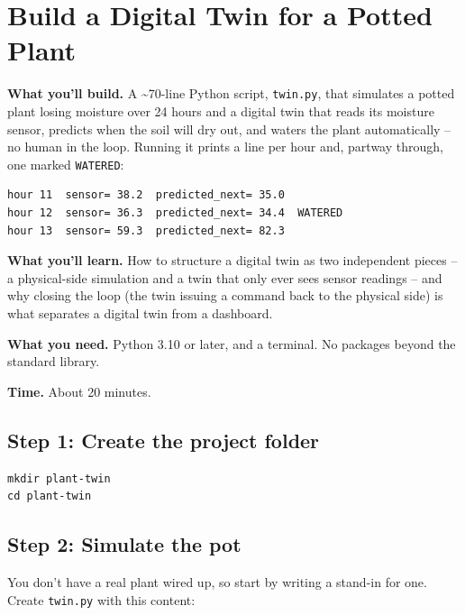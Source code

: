 \documentclass[
  12pt,
  a4paper,
]{article}
\author{}
\date{}
\begin{document}
\section{Build a Digital Twin for a Potted
Plant}\label{build-a-digital-twin-for-a-potted-plant}

\textbf{What you'll build.} A \textasciitilde70-line Python script,
\texttt{twin.py}, that simulates a potted plant losing moisture over 24
hours and a digital twin that reads its moisture sensor, predicts when
the soil will dry out, and waters the plant automatically -- no human in
the loop. Running it prints a line per hour and, partway through, one
marked \texttt{WATERED}:

\begin{verbatim}
hour 11  sensor= 38.2  predicted_next= 35.0
hour 12  sensor= 36.3  predicted_next= 34.4  WATERED
hour 13  sensor= 59.3  predicted_next= 82.3
\end{verbatim}

\textbf{What you'll learn.} How to structure a digital twin as two
independent pieces -- a physical-side simulation and a twin that only
ever sees sensor readings -- and why closing the loop (the twin issuing
a command back to the physical side) is what separates a digital twin
from a dashboard.

\textbf{What you need.} Python 3.10 or later, and a terminal. No
packages beyond the standard library.

\textbf{Time.} About 20 minutes.

\subsection{Step 1: Create the project
folder}\label{step-1-create-the-project-folder}

\begin{verbatim}
mkdir plant-twin
cd plant-twin
\end{verbatim}

\subsection{Step 2: Simulate the pot}\label{step-2-simulate-the-pot}

You don't have a real plant wired up, so start by writing a stand-in for
one. Create \texttt{twin.py} with this content:
\end{document}
